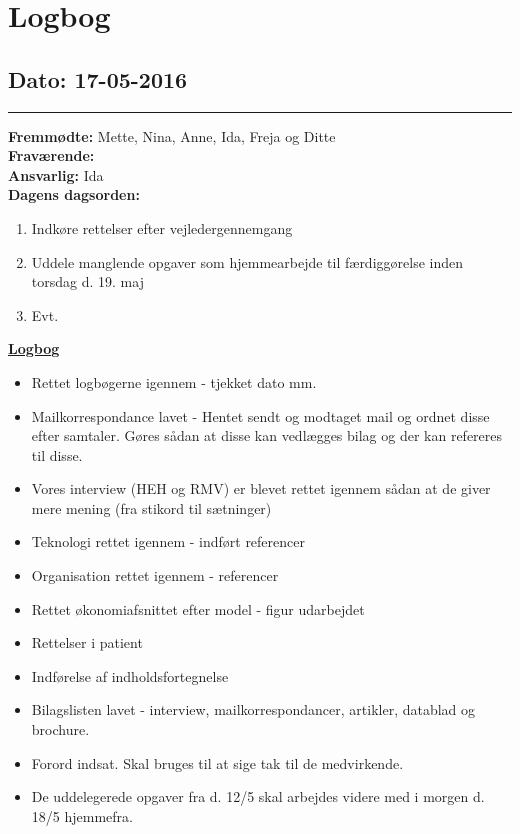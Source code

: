 \chapter{Logbog}
\section{Dato: 17-05-2016}
\hrule
\textbf{Fremmødte:} Mette, Nina, Anne, Ida, Freja og Ditte \\
\textbf{Fraværende:} \\
\textbf{Ansvarlig:} Ida \\
\textbf{Dagens dagsorden: }
\begin{enumerate}
\item Indkøre rettelser efter vejledergennemgang
\item Uddele manglende opgaver som hjemmearbejde til færdiggørelse inden torsdag d. 19. maj
\item Evt.
\end{enumerate}

\underline{\textbf{Logbog}}
\begin{itemize}
\item Rettet logbøgerne igennem - tjekket dato mm.
\item Mailkorrespondance lavet - Hentet sendt og modtaget mail og ordnet disse efter samtaler. Gøres sådan at disse kan vedlægges bilag og der kan refereres til disse.
\item Vores interview (HEH og RMV) er blevet rettet igennem sådan at de giver mere mening (fra stikord til sætninger)
\item Teknologi rettet igennem - indført referencer
\item Organisation rettet igennem - referencer 
\item Rettet økonomiafsnittet efter model - figur udarbejdet
\item Rettelser i patient
\item Indførelse af indholdsfortegnelse
\item Bilagslisten lavet - interview, mailkorrespondancer, artikler, datablad og brochure.
\item Forord indsat. Skal bruges til at sige tak til de medvirkende.
\item De uddelegerede opgaver fra d. 12/5 skal arbejdes videre med i morgen d. 18/5 hjemmefra.
\end{itemize}

\newpage